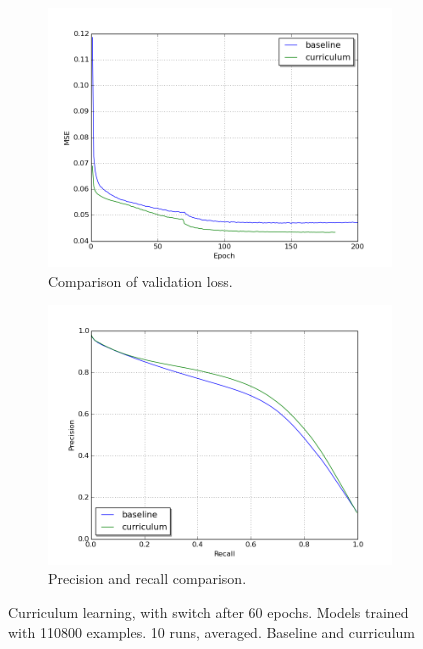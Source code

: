 \begin{figure}
\begin{subfigure}{0.48\textwidth}
\includegraphics[width=\linewidth]{figs/curr50/loss_compare_validation.png}
\caption{Comparison of validation loss.} \label{fig:curr50_loss}
\end{subfigure}
\hspace*{\fill} %
\begin{subfigure}{0.48\textwidth}
\includegraphics[width=\linewidth]{figs/curr50/validation_precision_recall_curve.png}
\caption{Precision and recall comparison.} \label{fig:curr50_pr}
\end{subfigure}
\hspace*{\fill} %
\caption{Curriculum learning, with switch after 60 epochs. Models trained with 110800 examples. 10 runs, averaged. Baseline and curriculum} \label{fig:curr50}
\end{figure}


